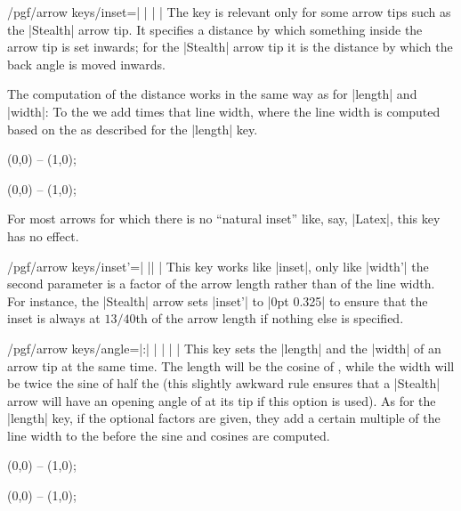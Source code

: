 \begin{key}{/pgf/arrow keys/inset=| |%
        | |}
    The key is relevant only for some arrow tips such as the |Stealth| arrow
    tip. It specifies a distance by which something inside the arrow tip is set
    inwards; for the |Stealth| arrow tip it is the distance by which the back
    angle is moved inwards.

    The computation of the distance works in the same way as for |length| and
    |width|: To the  we add  times that
    line width, where the line width is computed based on the  as described for the |length| key.
\begin{codeexample}[preamble={\usetikzlibrary{arrows.meta}}]
\tikz \draw [arrows = {-Stealth[length=10pt, inset=5pt]}] (0,0) -- (1,0);
\end{codeexample}
\begin{codeexample}[preamble={\usetikzlibrary{arrows.meta}}]
\tikz \draw [arrows = {-Stealth[length=10pt, inset=2pt]}] (0,0) -- (1,0);
\end{codeexample}

    For most arrows for which there is no ``natural inset'' like, say, |Latex|,
    this key has no effect.
\end{key}

\begin{key}{/pgf/arrow keys/inset'=| || |}
    This key works like |inset|, only like |width'| the second parameter is a
    factor of the arrow length rather than of the line width. For instance, the
    |Stealth| arrow sets |inset'| to |0pt 0.325| to ensure that the inset is
    always at $13/40$th of the arrow length if nothing else is specified.
\end{key}

\begin{key}{/pgf/arrow keys/angle=|:|%
        | |%
        | |}
    This key sets the |length| and the |width| of an arrow tip at the same
    time. The length will be the cosine of , while the width will
    be twice the sine of half the  (this slightly awkward rule
    ensures that a |Stealth| arrow will have an opening angle of 
    at its tip if this option is used). As for the |length| key, if the
    optional factors are given, they add a certain multiple of the line width
    to the  before the sine and cosines are computed.
\begin{codeexample}[preamble={\usetikzlibrary{arrows.meta}}]
\tikz \draw [arrows = {-Stealth[inset=0pt, angle=90:10pt]}] (0,0) -- (1,0);
\end{codeexample}
\begin{codeexample}[preamble={\usetikzlibrary{arrows.meta}}]
\tikz \draw [arrows = {-Stealth[inset=0pt, angle=30:10pt]}] (0,0) -- (1,0);
\end{codeexample}
\end{key}

